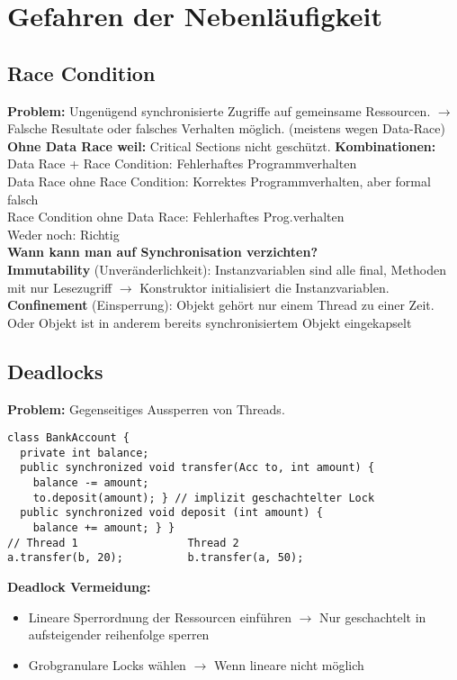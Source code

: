 
\section{Gefahren der Nebenläufigkeit}
\subsection{Race Condition}
\textcolor{b}{\textbf{Problem:}} Ungenügend synchronisierte Zugriffe auf gemeinsame Ressourcen. $\rightarrow$ Falsche Resultate oder falsches Verhalten möglich. (meistens wegen Data-Race)\\
\textbf{Ohne Data Race weil:} Critical Sections nicht geschützt.
\textbf{Kombinationen:}\\
\textcolor{b}{Data Race + Race Condition:} Fehlerhaftes Programmverhalten\\
\textcolor{b}{Data Race ohne Race Condition:} Korrektes Programmverhalten, aber formal falsch\\
\textcolor{b}{Race Condition ohne Data Race:} Fehlerhaftes Prog.verhalten\\
\textcolor{b}{Weder noch:} Richtig\\
\textcolor{b}{\textbf{Wann kann man auf Synchronisation verzichten?}}\\
\textbf{Immutability} (Unveränderlichkeit): Instanzvariablen sind alle \textcolor{b}{final}, Methoden mit nur Lesezugriff $\rightarrow$ Konstruktor initialisiert die Instanzvariablen.\\
\textbf{Confinement} (Einsperrung): Objekt gehört nur einem Thread zu einer Zeit. Oder Objekt ist in anderem bereits synchronisiertem Objekt eingekapselt
\subsection{Deadlocks}
\textcolor{b}{\textbf{Problem:}} Gegenseitiges Aussperren von Threads.
\begin{lstlisting}
class BankAccount {
  private int balance;
  public synchronized void transfer(Acc to, int amount) {
    balance -= amount;
    to.deposit(amount); } // implizit geschachtelter Lock
  public synchronized void deposit (int amount) {
    balance += amount; } }
// Thread 1                 Thread 2
a.transfer(b, 20);          b.transfer(a, 50);
\end{lstlisting}
\textcolor{b}{\textbf{Deadlock Vermeidung:}}
\begin{itemize}[topsep=0pt, leftmargin=3mm]
    \setlength\itemsep{-0.3em}
    \item Lineare Sperrordnung der Ressourcen einführen $\rightarrow$ Nur geschachtelt in aufsteigender reihenfolge sperren
    \item Grobgranulare Locks wählen $\rightarrow$ Wenn lineare nicht möglich
\end{itemize}
